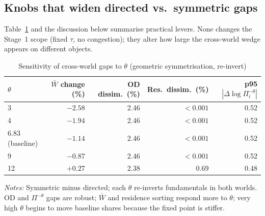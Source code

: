 \documentclass[12pt]{article}
\newcommand{\Wbar}{\bar W}
\begin{document}
\subsection{Knobs that widen directed vs.\ symmetric gaps}

Table~\ref{tab:theta} and the discussion below summarise practical levers.
None changes the Stage~1 scope (fixed $\tau$, no congestion); they alter how large
the cross-world wedge appears on different objects.

\begin{table}[htbp]
  \centering
  \caption{Sensitivity of cross-world gaps to $\theta$ (geometric symmetrisation, re-invert)}
  \label{tab:theta}
  \begin{tabular}{lrrrr}
  \toprule
  $\theta$ & $\Wbar$ change (\%) & OD dissim.\ (\%) & Res.\ dissim.\ (\%) & p95 $|\Delta\log\Pi_i^{-\theta}|$ \\
  \midrule
  3   & $-2.58$ & 2.46 & $<0.001$ & 0.52 \\
  4   & $-1.94$ & 2.46 & $<0.001$ & 0.52 \\
  6.83 (baseline) & $-1.14$ & 2.46 & $<0.001$ & 0.52 \\
  9   & $-0.87$ & 2.46 & $<0.001$ & 0.52 \\
  12  & $+0.27$ & 2.38 & 0.69 & 0.48 \\
  \bottomrule
  \end{tabular}
  \vspace{0.4em}

  \begin{minipage}{0.92\textwidth}
  \footnotesize
  \emph{Notes:} Symmetric minus directed; each $\theta$ re-inverts fundamentals in both
  worlds. OD and $\Pi^{- \theta}$ gaps are robust; $\Wbar$ and residence sorting respond
  more to $\theta$; very high $\theta$ begins to move baseline shares because the fixed
  point is stiffer.
  \end{minipage}
\end{table}
\end{document}
